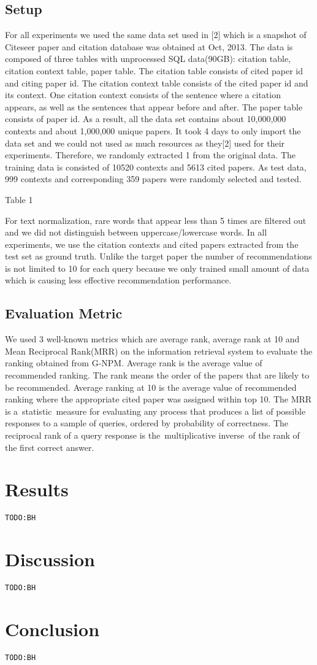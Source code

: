 \documentclass{llncs}
\newcommand{\todo}[1]{\texttt{\color{red}TODO:#1}}
\begin{document}
\subsection{Setup}
For all experiments we used the same data set used in [2] which is a snapshot of Citeseer paper and citation database was obtained at Oct, 2013. The data is composed of three tables with unprocessed SQL data(90GB): citation table, citation context table, paper table. The citation table consists of cited paper id and citing paper id. The citation context table consists of the cited paper id and its context. One citation context consists of the sentence where a citation appears, as well as the sentences that appear before and after. The paper table consists of paper id. As a result, all the data set contains about 10,000,000 contexts and about 1,000,000 unique papers.
It took 4 days to only import the data set and we could not used as much resources as they[2] used for their experiments. Therefore, we randomly extracted 1 from the original data. The training data is consisted of 10520 contexts and 5613 cited papers. As test data, 999 contexts and corresponding 359 papers were randomly selected and tested.


Table 1

For text normalization, rare words that appear less than 5 times are filtered out and we did not distinguish between uppercase/lowercase words. In all experiments, we use the citation contexts and cited papers extracted from the test set as ground truth. Unlike the target paper the number of recommendations is not limited to 10 for each query because we only trained small amount of data which is causing less effective recommendation performance.

\subsection{Evaluation Metric}
We used 3 well-known metrics which are average rank, average rank at 10 and Mean Reciprocal Rank(MRR) on the information retrieval system to evaluate the ranking obtained from G-NPM. Average rank is the average value of recommended ranking. The rank means the order of the papers that are likely to be recommended. Average ranking at 10 is the average value of recommended ranking where the appropriate cited paper was assigned within top 10. The MRR is a statistic measure for evaluating any process that produces a list of possible responses to a sample of queries, ordered by probability of correctness. The reciprocal rank of a query response is the multiplicative inverse of the rank of the first correct answer.


\section{Results}
\todo{BH}

\section{Discussion}
\todo{BH}

\section{Conclusion}
\label{sec:Conclusion}
\todo{BH}




\end{document}

